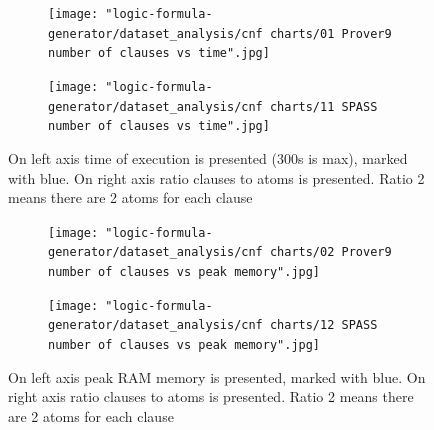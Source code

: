 \begin{figure}[H]
\centering
  \begin{subfigure}{0.8\textwidth}
\centering
  \texttt{[image: "logic-formula-generator/dataset\_analysis/cnf charts/01 Prover9 number of clauses vs time".jpg]}
  \label{pic:benchmark_results}
  \end{subfigure}

  \begin{subfigure}{\textwidth}
\centering
  \texttt{[image: "logic-formula-generator/dataset\_analysis/cnf charts/11 SPASS number of clauses vs time".jpg]}
  \end{subfigure}
  \caption{On left axis time of execution is presented (300s is max), marked with blue. On right axis ratio clauses to atoms is presented. Ratio 2 means there are 2 atoms for each clause}
  \label{pic:SPASSProverNumberOfClauses}
\end{figure}

\begin{figure}[H]
\centering
  \begin{subfigure}{0.8\textwidth}
\centering
  \texttt{[image: "logic-formula-generator/dataset\_analysis/cnf charts/02 Prover9 number of clauses vs peak memory".jpg]}
  \label{pic:benchmark_results}
  \end{subfigure}

  \begin{subfigure}{\textwidth}
\centering
\texttt{[image: "logic-formula-generator/dataset\_analysis/cnf charts/12 SPASS number of clauses vs peak memory".jpg]}
  \end{subfigure}
  \caption{On left axis peak RAM memory is presented, marked with blue. On right axis ratio clauses to atoms is presented. Ratio 2 means there are 2 atoms for each clause}
  \label{pic:SPASSProverMemory}
\end{figure}

%
%
%
%
%

